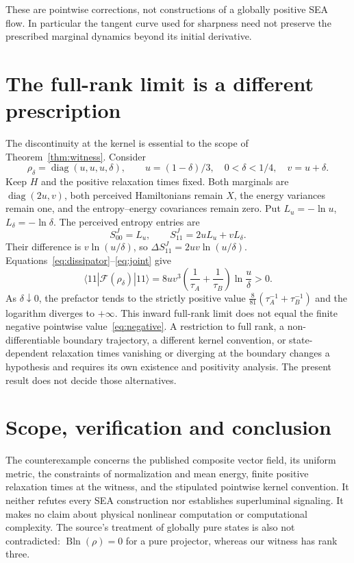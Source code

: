 \documentclass[11pt]{article}
\newcommand{\diag}{\operatorname{diag}}
\newcommand{\bln}{\operatorname{Bln}}
\begin{document}
These are pointwise corrections, not constructions of a globally positive SEA flow. In particular the tangent curve used for sharpness need not preserve the prescribed marginal dynamics beyond its initial derivative.

\section{The full-rank limit is a different prescription}
The discontinuity at the kernel is essential to the scope of Theorem~\ref{thm:witness}. Consider
\begin{equation}
 \rho_\delta=\diag(u,u,u,\delta),\qquad u=(1-\delta)/3,
 \quad 0<\delta<1/4,\quad v=u+\delta.
\end{equation}
Keep $H$ and the positive relaxation times fixed. Both marginals are $\diag(2u,v)$, both perceived Hamiltonians remain $X$, the energy variances remain one, and the entropy--energy covariances remain zero. Put $L_u=-\ln u$, $L_\delta=-\ln\delta$. The perceived entropy entries are
\begin{equation}
 S^J_{00}=L_u,\qquad S^J_{11}=2uL_u+vL_\delta.
\end{equation}
Their difference is $v\ln(u/\delta)$, so $\Delta S^J_{11}=2uv\ln(u/\delta)$. Equations~\eqref{eq:dissipator}--\eqref{eq:joint} give
\begin{equation}
 \langle11|\mathcal F(\rho_\delta)|11\rangle
 =8uv^3\left(\frac1{\tau_A}+\frac1{\tau_B}\right)
 \ln\frac{u}{\delta}>0.\label{eq:fullrank}
\end{equation}
As $\delta\downarrow0$, the prefactor tends to the strictly positive value $\tfrac8{81}(\tau_A^{-1}+\tau_B^{-1})$ and the logarithm diverges to $+\infty$. This inward full-rank limit does not equal the finite negative pointwise value~\eqref{eq:negative}. A restriction to full rank, a non-differentiable boundary trajectory, a different kernel convention, or state-dependent relaxation times vanishing or diverging at the boundary changes a hypothesis and requires its own existence and positivity analysis. The present result does not decide those alternatives.

\section{Scope, verification and conclusion}
The counterexample concerns the published composite vector field, its uniform metric, the constraints of normalization and mean energy, finite positive relaxation times at the witness, and the stipulated pointwise kernel convention. It neither refutes every SEA construction nor establishes superluminal signaling. It makes no claim about physical nonlinear computation or computational complexity. The source's treatment of globally pure states is also not contradicted: $\bln(\rho)=0$ for a pure projector, whereas our witness has rank three.
\end{document}
